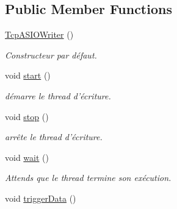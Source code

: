 \subsection*{Public Member Functions}
\begin{DoxyCompactItemize}
\item 
\hypertarget{classmognetwork_1_1_tcp_a_s_i_o_writer_ad9ccc4046f754b839e79263c54baa3d6}{\hyperlink{classmognetwork_1_1_tcp_a_s_i_o_writer_ad9ccc4046f754b839e79263c54baa3d6}{Tcp\-A\-S\-I\-O\-Writer} ()}\label{classmognetwork_1_1_tcp_a_s_i_o_writer_ad9ccc4046f754b839e79263c54baa3d6}

\begin{DoxyCompactList}\small\item\em Constructeur par défaut. \end{DoxyCompactList}\item 
\hypertarget{classmognetwork_1_1_tcp_a_s_i_o_writer_ac7adf2ec565c463b28f7b584be565863}{void \hyperlink{classmognetwork_1_1_tcp_a_s_i_o_writer_ac7adf2ec565c463b28f7b584be565863}{start} ()}\label{classmognetwork_1_1_tcp_a_s_i_o_writer_ac7adf2ec565c463b28f7b584be565863}

\begin{DoxyCompactList}\small\item\em démarre le thread d'écriture. \end{DoxyCompactList}\item 
\hypertarget{classmognetwork_1_1_tcp_a_s_i_o_writer_a72d4c74cb2fb05c23f6245de796a0928}{void \hyperlink{classmognetwork_1_1_tcp_a_s_i_o_writer_a72d4c74cb2fb05c23f6245de796a0928}{stop} ()}\label{classmognetwork_1_1_tcp_a_s_i_o_writer_a72d4c74cb2fb05c23f6245de796a0928}

\begin{DoxyCompactList}\small\item\em arrête le thread d'écriture. \end{DoxyCompactList}\item 
\hypertarget{classmognetwork_1_1_tcp_a_s_i_o_writer_ad3bd21b81839315d4409914f30de8652}{void \hyperlink{classmognetwork_1_1_tcp_a_s_i_o_writer_ad3bd21b81839315d4409914f30de8652}{wait} ()}\label{classmognetwork_1_1_tcp_a_s_i_o_writer_ad3bd21b81839315d4409914f30de8652}

\begin{DoxyCompactList}\small\item\em Attends que le thread termine son exécution. \end{DoxyCompactList}\item 
\hypertarget{classmognetwork_1_1_tcp_a_s_i_o_writer_a69906d01efaf03f6a2d5987e2f54ba87}{void \hyperlink{classmognetwork_1_1_tcp_a_s_i_o_writer_a69906d01efaf03f6a2d5987e2f54ba87}{trigger\-Data} ()}\label{classmognetwork_1_1_tcp_a_s_i_o_writer_a69906d01efaf03f6a2d5987e2f54ba87}


\end{DoxyCompactItemize}
